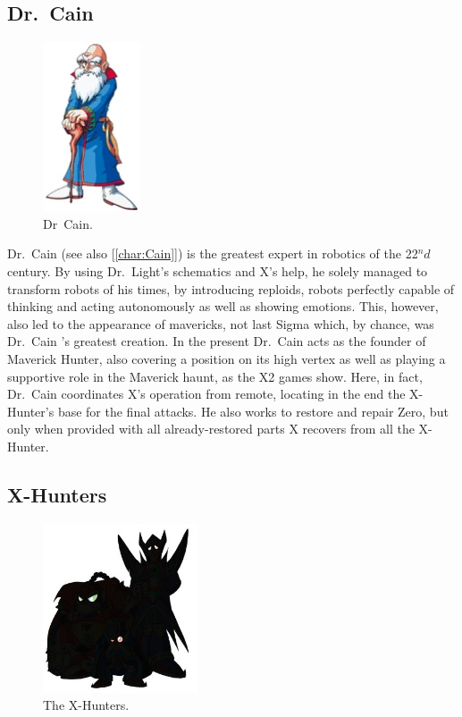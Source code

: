 \subsection{Dr.~Cain}
\begin{figure}[htp]
	\centering
	\includegraphics[height=5cm]{figures/Characters/Char_Cain_X2.png}
	\caption{Dr~Cain.}
\end{figure}
Dr.~Cain (see also [\ref{char:Cain}]) is the greatest expert in robotics of the 22$^nd$ century\cite{Xcoll1:Manual_X2}. By using Dr.~Light's schematics and X's help, he solely managed to transform robots of his times, by introducing reploids, robots perfectly capable of thinking and acting autonomously as well as showing emotions. This, however, also led to the appearance of mavericks, not last Sigma which, by chance, was Dr.~Cain 's greatest creation. In the present Dr.~Cain acts as the founder of Maverick Hunter, also covering a position on its high vertex as well as playing a supportive role in the Maverick haunt, as the X2 games show. Here, in fact, Dr.~Cain coordinates X's operation from remote, locating in the end the X-Hunter's base for the final attacks. He also works to restore and repair Zero, but only when provided with all already-restored parts X recovers from all the X-Hunter.

\subsection{X-Hunters}
\begin{figure}[htp]
	\centering
	\includegraphics[height=5cm]{figures/X2/Enemies/X_Hunters.jpg}
	\caption{The X-Hunters.}
\end{figure}


